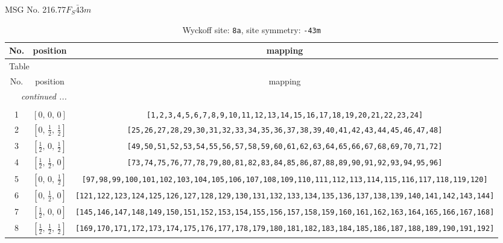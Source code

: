 \documentclass[fleqn,8pt]{jsarticle}
\begin{document}
\setcounter{MaxMatrixCols}{32}

\renewcommand{\tablename}{Table~}
\renewcommand{\figurename}{Figure~}
\begin{center}
\LARGE
MSG No. 216.77\quad$F_{S}\bar{4}3m$
\end{center}
\renewcommand{\arraystretch}{1.2}
\begin{longtable}{ccc}
\caption{Wyckoff site: {\tt 8a}, site symmetry: {\tt -43m}}
 \\
 \hline \hline
No. & position & mapping \\ \hline \endfirsthead

\multicolumn{2}{l}{\tablename\ \thetable{}} \\
 \hline \hline
No. & position & mapping \\ \hline \endhead

 \hline \hline
\multicolumn{2}{r}{\footnotesize\it continued ...} \\ \endfoot

 \hline \hline
\multicolumn{2}{r}{} \\ \endlastfoot

1 & $\left[ 0,\, 0,\, 0 \right]$ & {\tt [1,2,3,4,5,6,7,8,9,10,11,12,13,14,15,16,17,18,19,20,21,22,23,24]} \\ \hline
2 & $\left[ 0,\, \frac{1}{2},\, \frac{1}{2} \right]$ & {\tt [25,26,27,28,29,30,31,32,33,34,35,36,37,38,39,40,41,42,43,44,45,46,47,48]} \\ \hline
3 & $\left[ \frac{1}{2},\, 0,\, \frac{1}{2} \right]$ & {\tt [49,50,51,52,53,54,55,56,57,58,59,60,61,62,63,64,65,66,67,68,69,70,71,72]} \\ \hline
4 & $\left[ \frac{1}{2},\, \frac{1}{2},\, 0 \right]$ & {\tt [73,74,75,76,77,78,79,80,81,82,83,84,85,86,87,88,89,90,91,92,93,94,95,96]} \\ \hline
5 & $\left[ 0,\, 0,\, \frac{1}{2} \right]$ & {\tt [97,98,99,100,101,102,103,104,105,106,107,108,109,110,111,112,113,114,115,116,117,118,119,120]} \\ \hline
6 & $\left[ 0,\, \frac{1}{2},\, 0 \right]$ & {\tt [121,122,123,124,125,126,127,128,129,130,131,132,133,134,135,136,137,138,139,140,141,142,143,144]} \\ \hline
7 & $\left[ \frac{1}{2},\, 0,\, 0 \right]$ & {\tt [145,146,147,148,149,150,151,152,153,154,155,156,157,158,159,160,161,162,163,164,165,166,167,168]} \\ \hline
8 & $\left[ \frac{1}{2},\, \frac{1}{2},\, \frac{1}{2} \right]$ & {\tt [169,170,171,172,173,174,175,176,177,178,179,180,181,182,183,184,185,186,187,188,189,190,191,192]} \\
\end{longtable}
\end{document}
